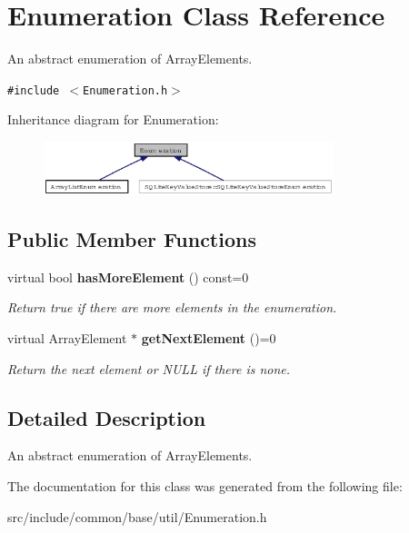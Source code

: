 \section{Enumeration Class Reference}
\label{classEnumeration}
An abstract enumeration of Array\-Elements.  


{\tt \#include $<$Enumeration.h$>$}

Inheritance diagram for Enumeration:\begin{figure}[H]
\begin{center}
\leavevmode
\includegraphics[width=239pt]{classEnumeration__inherit__graph}
\end{center}
\end{figure}
\subsection*{Public Member Functions}
\begin{CompactItemize}
\item 
virtual bool {\bf has\-More\-Element} () const=0\label{classEnumeration_08caec98de9d45498cdbf3e56168f661}

\begin{CompactList}\small\item\em Return true if there are more elements in the enumeration. \item\end{CompactList}\item 
virtual Array\-Element $\ast$ {\bf get\-Next\-Element} ()=0\label{classEnumeration_08853796f78490e7a7edb61c520fe2ee}

\begin{CompactList}\small\item\em Return the next element or NULL if there is none. \item\end{CompactList}\end{CompactItemize}


\subsection{Detailed Description}
An abstract enumeration of Array\-Elements. 



The documentation for this class was generated from the following file:\begin{CompactItemize}
\item 
src/include/common/base/util/Enumeration.h\end{CompactItemize}
